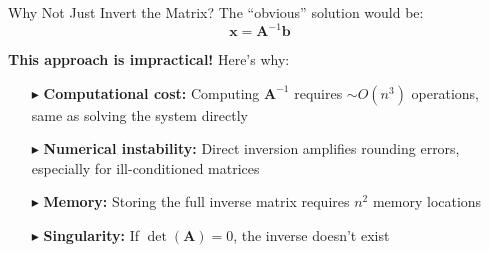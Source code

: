 \documentclass[aspectratio=169]{beamer}
\begin{document}
\begin{frame}{Why Not Just Invert the Matrix?}
	The ``obvious'' solution would be:
	\begin{equation*}
		\mathbf{x} = \mathbf{A}^{-1} \mathbf{b}
	\end{equation*}

	\textcolor{WildStrawberry}{\textbf{This approach is impractical!}} Here's why:
	\vspace{0.1cm}

	\begin{itemize}
		\item[$\blacktriangleright$]
		      \textbf{Computational cost:} Computing $\mathbf{A}^{-1}$ requires $\sim O(n^3)$ operations, same as solving the system directly
		      \vspace{0.3cm}
		\item[$\blacktriangleright$]
		      \textbf{Numerical instability:} Direct inversion amplifies rounding errors, especially for ill-conditioned matrices
		      \vspace{0.3cm}
		\item[$\blacktriangleright$]
		      \textbf{Memory:} Storing the full inverse matrix requires $n^2$ memory locations
		      \vspace{0.3cm}
		\item[$\blacktriangleright$]
		      \textbf{Singularity:} If $\det(\mathbf{A}) = 0$, the inverse doesn't exist
	\end{itemize}
\end{frame}
\end{document}
